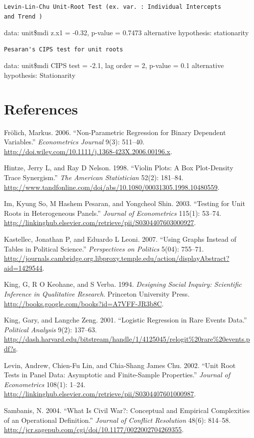 \documentclass[11pt,article,oneside]{memoir}
\begin{document}
\begin{verbatim}
Levin-Lin-Chu Unit-Root Test (ex. var. : Individual Intercepts
and Trend )
\end{verbatim}

data: unit\$mdi z.x1 = -0.32, p-value = 0.7473 alternative hypothesis:
stationarity

\begin{verbatim}
Pesaran's CIPS test for unit roots
\end{verbatim}

data: unit\$mdi CIPS test = -2.1, lag order = 2, p-value = 0.1
alternative hypothesis: Stationarity

\pagebreak   

\section{References}\label{references}

\setlength{\parindent}{-0.2in} \setlength{\leftskip}{0.2in}
\setlength{\parskip}{8pt} \vspace*{-0.2in} \noindent

Fr{ö}lich, Markus. 2006. ``Non-Parametric Regression for Binary
Dependent Variables.'' \emph{Econometrics Journal} 9(3): 511--40.
\url{http://doi.wiley.com/10.1111/j.1368-423X.2006.00196.x}.

Hintze, Jerry L, and Ray D Nelson. 1998. ``Violin Plots: A Box
Plot-Density Trace Synergism.'' \emph{The American Statistician} 52(2):
181--84.
\url{http://www.tandfonline.com/doi/abs/10.1080/00031305.1998.10480559}.

Im, Kyung So, M Hashem Pesaran, and Yongcheol Shin. 2003. ``Testing for
Unit Roots in Heterogeneous Panels.'' \emph{Journal of Econometrics}
115(1): 53--74.
\url{http://linkinghub.elsevier.com/retrieve/pii/S0304407603000927}.

Kastellec, Jonathan P, and Eduardo L Leoni. 2007. ``Using Graphs Instead
of Tables in Political Science.'' \emph{Perspectives on Politics} 5(04):
755--71.
\url{http://journals.cambridge.org.libproxy.temple.edu/action/displayAbstract?aid=1429544}.

King, G, R O Keohane, and S Verba. 1994. \emph{Designing Social Inquiry:
Scientific Inference in Qualitative Research}. Princeton University
Press. \url{http://books.google.com/books?id=A7VFF-JR3b8C}.

King, Gary, and Langche Zeng. 2001. ``Logistic Regression in Rare Events
Data.'' \emph{Political Analysis} 9(2): 137--63.
\url{http://dash.harvard.edu/bitstream/handle/1/4125045/relogit\%20rare\%20events.pdf?s}.

Levin, Andrew, Chien-Fu Lin, and Chia-Shang James Chu. 2002. ``Unit Root
Tests in Panel Data: Asymptotic and Finite-Sample Properties.''
\emph{Journal of Econometrics} 108(1): 1--24.
\url{http://linkinghub.elsevier.com/retrieve/pii/S0304407601000987}.

Sambanis, N. 2004. ``What Is Civil War?: Conceptual and Empirical
Complexities of an Operational Definition.'' \emph{Journal of Conflict
Resolution} 48(6): 814--58.
\url{http://jcr.sagepub.com/cgi/doi/10.1177/0022002704269355}.
\end{document}
